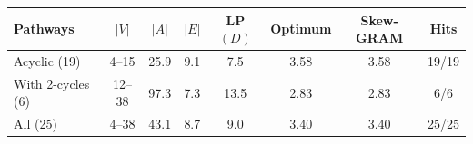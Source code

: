 \setlength{\tabcolsep}{5pt}
\begin{tabular}{@{}l c S[table-format=2.1] S[table-format=1.1] S[table-format=2.1] S[table-format=1.2] S[table-format=1.2] c@{}}
\toprule
Pathways & $|V|$ & {$|A|$} & {$|E|$} & {LP$(D)$} & {Optimum} & {Skew-GRAM} & Hits \\
\midrule
Acyclic (19) & 4--15 & 25.9 & 9.1 & 7.5 & 3.58 & 3.58 & 19/19 \\
With 2-cycles (6) & 12--38 & 97.3 & 7.3 & 13.5 & 2.83 & 2.83 & 6/6 \\
\midrule
All (25) & 4--38 & 43.1 & 8.7 & 9.0 & 3.40 & 3.40 & 25/25 \\
\bottomrule
\end{tabular}
